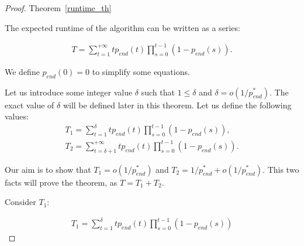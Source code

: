 \documentclass{article}
\begin{document}
\begin{proof}{Theorem~\ref{runtime_th}}

The expected runtime of the algorithm can be written as a series:

\begin{align*}
  T = \sum\limits_{t = 1}^{+\infty} t p_{end}(t) \prod\limits_{s = 0}^{t - 1} (1 - p_{end}(s)).
\end{align*}

We define $p_{end}(0) = 0$ to simplify some equations.

Let us introduce some integer value $\delta$ such that $1 \le \delta$ and $\delta = o(1/p_{end}^*)$. The exact value of $\delta$ will be defined later in this theorem. Let us define the following values:
\begin{align*}
  T_1 = \sum\limits_{t = 1}^{\delta} t p_{end}(t) \prod\limits_{s = 0}^{t - 1} (1 - p_{end}(s)), \\
  T_2 = \sum\limits_{t = \delta + 1}^{+\infty} t p_{end}(t) \prod\limits_{s = 0}^{t - 1} (1 - p_{end}(s)).
\end{align*}

Our aim is to show that $T_1 = o(1/p_{end}^*)$ and $T_2 = 1/p_{end}^* + o(1/p_{end}^*).$ This two facts will prove the theorem, as $T = T_1 + T_2$.

Consider $T_1$:

\begin{align*}
  T_1 =  \sum\limits_{t = 1}^{\delta} t p_{end}(t) \prod\limits_{s = 0}^{t - 1} (1 - p_{end}(s))
\end{align*}
\end{proof}

\printbibliography
\end{document}
